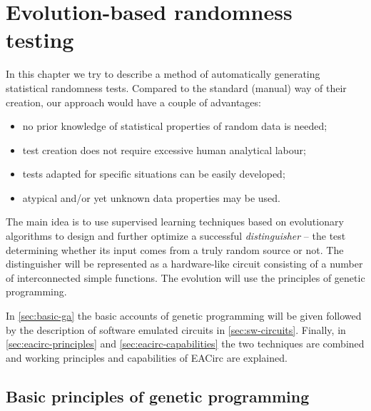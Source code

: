 \documentclass[12pt,oneside]{fithesis2}		%
\renewcommand{\_}{\leavevmode \kern0.0em\vbox{\hrule width0.4em}}
\newcommand{\squarebullet}{\textcolor{black}{\raisebox{0.15em}{\rule{4pt}{4pt}}}}
\newenvironment{myItemize}{
  \begin{itemize}[leftmargin=2em,rightmargin=1em,itemsep=\parskip ,parsep=0em,topsep=0em,partopsep=0em]
  \renewcommand{\labelitemi}{\squarebullet}
  \renewcommand{\labelitemii}{$\diamond$}
}{
  \end{itemize}
}
\begin{document}
\chapter{Evolution-based randomness testing}
\label{chap:evo-based-testing}

In this chapter we try to describe a method of automatically generating statistical randomness tests. Compared to the standard
(manual) way of their creation, our approach would have a couple of advantages: 
\begin{myItemize}
\item no prior knowledge of statistical properties of random data is needed;
\item test creation does not require excessive human analytical labour;
\item tests adapted for specific situations can be easily developed;
\item atypical and/or yet unknown data properties may be used.
\end{myItemize}

\noindent
The main idea is to use supervised learning techniques based on evolutionary algorithms to design and further 
optimize a successful \textit{distinguisher} -- the test determining whether its input comes from a truly random source or not. 
The distinguisher will be represented as a hardware-like circuit consisting of a number of interconnected simple functions.
The evolution will use the principles of genetic programming.

In \autoref{sec:basic-ga} the basic accounts of genetic programming will be given followed by the description
of software emulated circuits in \autoref{sec:sw-circuits}. Finally, in \autoref{sec:eacirc-principles} and 
\autoref{sec:eacirc-capabilities} the two techniques are combined and working principles and capabilities of EACirc are
explained.

\section{Basic principles of genetic programming}
\label{sec:basic-ga}
\end{document}
